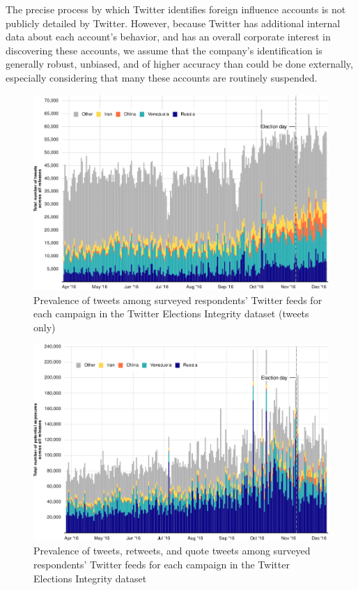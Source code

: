\documentclass[
  12pt,
]{article}
\begin{document}
The precise process by which Twitter identifies foreign influence accounts is not publicly detailed by Twitter. However, because Twitter has additional internal data about each account's behavior, and has an overall corporate interest in discovering these accounts, we assume that the company's identification is generally robust, unbiased, and of higher accuracy than could be done externally, especially considering that many these accounts are routinely suspended.

\clearpage

\begin{figure}[h]

{\centering \includegraphics[width=1\linewidth,height=0.6\textheight]{Appendix_files/figure-latex/Figure-A1-1} 

}

\caption{Prevalence of tweets among surveyed respondents' Twitter feeds for each campaign in the Twitter Elections Integrity dataset (tweets only)}\label{fig:Figure-A1}
\end{figure}

\begin{figure}[h]

{\centering \includegraphics[width=1\linewidth,height=0.65\textheight]{Appendix_files/figure-latex/Figure-A2-1} 

}

\caption{Prevalence of tweets, retweets, and quote tweets among surveyed respondents' Twitter feeds for each campaign in the Twitter Elections Integrity dataset}\label{fig:Figure-A2}
\end{figure}
\end{document}
